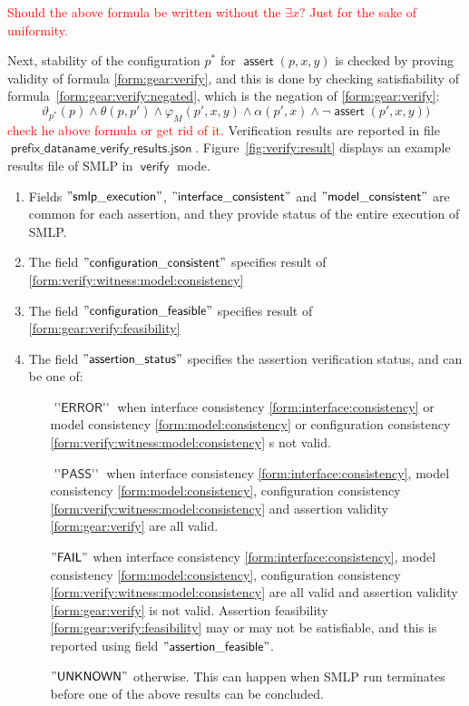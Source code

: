 \documentclass[a4paper,parskip=half]{article} %
\newcommand*\assert{\operatorname{\mathsf{assert}}}
\newcommand*\suffix[1]{\operatorname{\mathsf{#1}}} %
\newcommand*\mode[1]{\operatorname{\mathsf{#1}}} %
\newcommand*\speckey[1]{\operatorname{\mathsf{"{#1}"}}} %
\newcommand*\specval[1]{\operatorname{\mathsf{{#1}}}} %
\newcommand\todozk[1]{\textcolor{red}{#1}}
\newcommand*\ZK{\todozk}
\begin{document}
 \ZK{Should the above formula be written without the $\exists x$? Just for the sake of uniformity.}


Next, stability of the configuration $p^*$ for $\assert(p,x,y)$ is checked by proving validity of formula \cref{form:gear:verify},
and this is done by checking satisfiability of formula~\cref{form:gear:verify:negated}, which is the negation of \cref{form:gear:verify}:
\begin{equation}\label{form:gear:verify:negated}
\vartheta_{p^*}(p) \wedge \theta(p, p')  \wedge  \varphi_M(p',x,y)  \wedge  \alpha(p',x) \wedge   \neg \assert(p',x,y))
\end{equation}
\ZK{check he above formula or get rid of it.}
Verification results are reported in file $\suffix{prefix\_dataname\_verify\_results.json}$.
Figure~\ref{fig:verify:result} displays an example results file of SMLP in $\mode{verify}$ mode.

\begin{enumerate}
\item Fields $\speckey{smlp\_execution}$,  $\speckey{interface\_consistent}$ and $\speckey{model\_consistent}$
are common for each assertion, and they provide status of the entire execution of SMLP.
\item The field  $\speckey{configuration\_consistent}$ specifies result of \cref{form:verify:witness:model:consistency}
\item The field  $\speckey{configuration\_feasible}$ specifies result of \cref{form:gear:verify:feasibility}
\item The field  $\speckey{assertion\_status}$ specifies the assertion verification status, and can be one of:
\begin{itemize}
\item[$\specval{''ERROR''}$]  when interface consistency \cref{form:interface:consistency} or
model consistency \cref{form:model:consistency} or configuration consistency \cref{form:verify:witness:model:consistency} s not valid.
\item[$\specval{''PASS''}$]  when interface consistency \cref{form:interface:consistency}, 
model consistency \cref{form:model:consistency},  configuration consistency \cref{form:verify:witness:model:consistency} 
and  assertion validity \cref{form:gear:verify}  are all valid.
\item[$\specval{"FAIL"}$]  when interface consistency \cref{form:interface:consistency}, 
model consistency \cref{form:model:consistency},  configuration consistency \cref{form:verify:witness:model:consistency} 
are all valid and  assertion validity \cref{form:gear:verify}  is not valid.
Assertion feasibility \cref{form:gear:verify:feasibility} may or may not be satisfiable, and this is reported using
field $\speckey{assertion\_feasible}$.
\item[$\specval{"UNKNOWN"}$] otherwise.  This can happen when SMLP run terminates before one of the above 
results can be concluded.
\end{itemize}
\end{enumerate}
\end{document}
